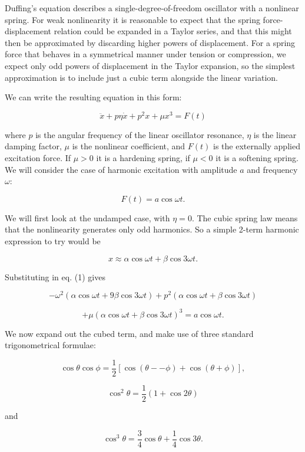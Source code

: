   Duffing's equation describes a single-degree-of-freedom oscillator with a 
  nonlinear spring. For weak nonlinearity it is reasonable to expect that the 
  spring force-displacement relation could be expanded in a Taylor series, and 
  that this might then be approximated by discarding higher powers of 
  displacement. For a spring force that behaves in a symmetrical manner under 
  tension or compression, we expect only odd powers of displacement in the 
  Taylor expansion, so the simplest approximation is to include just a cubic 
  term alongside the linear variation. 

  We can write the resulting equation in this form: 

  $$\ddot{x}+p \eta \dot{x} +p^2 x +\mu x^3 = F(t) \tag{1}$$ 

  where $p$ is the angular frequency of the linear oscillator resonance, $\eta$ 
  is the linear damping factor, $\mu$ is the nonlinear coefficient, and $F(t)$ 
  is the externally applied excitation force. If $\mu > 0$ it is a hardening 
  spring, if $\mu < 0$ it is a softening spring. We will consider the case of 
  harmonic excitation with amplitude $a$ and frequency $\omega$: 

  $$F(t)=a \cos \omega t . \tag{2}$$ 

  We will first look at the undamped case, with $\eta =0$. The cubic spring law 
  means that the nonlinearity generates only odd harmonics. So a simple 2-term 
  harmonic expression to try would be 

  $$x \approx \alpha \cos \omega t + \beta \cos 3\omega t . \tag{3}$$ 

  Substituting in eq. (1) gives 

  $$-\omega^2 \left(\alpha \cos \omega t + 9\beta \cos 3\omega t\right) + p^2 
  \left(\alpha \cos \omega t + \beta \cos 3\omega t\right)$$ 

  $$+\mu \left(\alpha \cos \omega t + \beta \cos 3\omega t\right)^3 = a \cos 
  \omega t. \tag{4}$$ 

  We now expand out the cubed term, and make use of three standard 
  trigonometrical formulae: 

  $$\cos \theta \cos \phi = \frac{1}{2} \left[\cos (\theta -- \phi) + \cos 
  (\theta + \phi) \right], \tag{5}$$ 

  $$\cos^2 \theta = \dfrac{1}{2}\left(1 + \cos 2 \theta \right) \tag{6}$$ 

  and 

  $$\cos^3 \theta =\frac{3}{4}\cos \theta + \frac{1}{4} \cos 3 \theta . 
  \tag{7}$$ 

